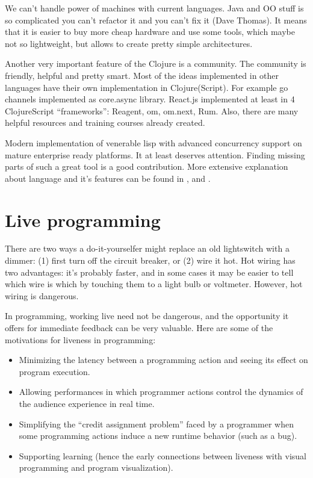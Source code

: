 We can't handle power of machines with current languages. Java and OO stuff is
so complicated you can't refactor it and you can't fix it (Dave Thomas). It
means that it is easier to buy more cheap hardware and use some tools, which
maybe not so lightweight, but allows to create pretty simple architectures.

Another very important feature of the Clojure is a community. The community is
friendly, helpful and pretty smart. Most of the ideas implemented in other
languages have their own implementation in Clojure(Script). For example go
channels implemented as core.async library. React.js implemented at least in 4
ClojureScript “frameworks”: Reagent, om, om.next, Rum. Also, there are many
helpful resources and training courses already created.

Modern implementation of venerable lisp with advanced concurrency support on
mature enterprise ready platforms. It at least deserves attention. Finding
missing parts of such a great tool is a good contribution. More extensive
explanation about language and it's features can be found in
\cite{halloway2009programming}, \cite{fogus2011joy} and
\cite{hickey2008clojure}.


\section{Live programming}

There are two ways a do-it-yourselfer might replace an old lightswitch with a
dimmer: (1) first turn off the circuit breaker, or (2) wire it hot. Hot wiring
has two advantages: it’s probably faster, and in some cases it may be easier to
tell which wire is which by touching them to a light bulb or voltmeter. However,
hot wiring is dangerous.

In programming, working live need not be dangerous, and the opportunity it
offers for immediate feedback can be very valuable. Here are some of the
motivations for liveness in programming:

\begin{itemize}
\item Minimizing the latency between a programming action and seeing its effect
  on program execution.
\item Allowing performances in which programmer actions control the dynamics of
  the audience experience in real time.
\item Simplifying the “credit assignment problem” faced by a programmer when
  some programming actions induce a new runtime behavior (such as a bug).
\item Supporting learning (hence the early connections between liveness with
  visual programming and program visualization).
\end{itemize}

